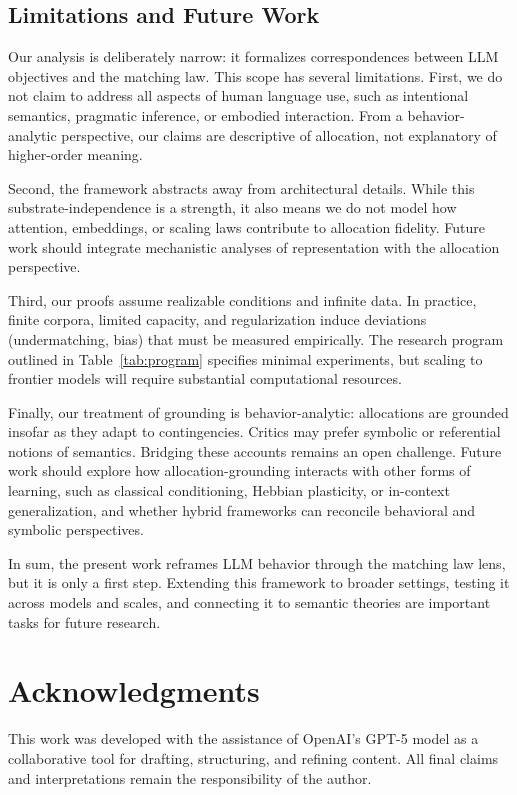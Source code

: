 \documentclass[11pt]{article}
\begin{document}
\subsection*{Limitations and Future Work}

Our analysis is deliberately narrow: it formalizes correspondences between LLM
objectives and the matching law. This scope has several limitations. First, we
do not claim to address all aspects of human language use, such as intentional
semantics, pragmatic inference, or embodied interaction. From a
behavior-analytic perspective, our claims are descriptive of allocation, not
explanatory of higher-order meaning.

Second, the framework abstracts away from architectural details. While this
substrate-independence is a strength, it also means we do not model how
attention, embeddings, or scaling laws contribute to allocation fidelity. Future
work should integrate mechanistic analyses of representation with the
allocation perspective.

Third, our proofs assume realizable conditions and infinite data. In practice,
finite corpora, limited capacity, and regularization induce deviations
(undermatching, bias) that must be measured empirically. The research program
outlined in Table~\ref{tab:program} specifies minimal experiments, but scaling
to frontier models will require substantial computational resources.

Finally, our treatment of grounding is behavior-analytic: allocations are
grounded insofar as they adapt to contingencies. Critics may prefer symbolic or
referential notions of semantics. Bridging these accounts remains an open
challenge. Future work should explore how allocation-grounding interacts with
other forms of learning, such as classical conditioning, Hebbian plasticity, or
in-context generalization, and whether hybrid frameworks can reconcile
behavioral and symbolic perspectives.

In sum, the present work reframes LLM behavior through the matching law lens,
but it is only a first step. Extending this framework to broader settings,
testing it across models and scales, and connecting it to semantic theories are
important tasks for future research.


\section{Acknowledgments}
This work was developed with the assistance of OpenAI's GPT-5 model as a collaborative tool for drafting, structuring, and refining content. All final claims and interpretations remain the responsibility of the author.
\end{document}
